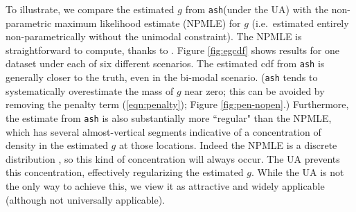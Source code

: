 \documentclass[11pt]{article}
\def\bhat{\hat{\beta}}
\def\mixfdr{{\tt mixfdr}\xspace}
\def\ash{{\tt ash}\xspace}
\begin{document}
To illustrate, we compare the
estimated $g$ from \ash (under the UA) with the non-parametric maximum likelihood estimate (NPMLE) for 
$g$ (i.e.~estimated entirely non-parametrically without the unimodal constraint). 
The NPMLE is straightforward to compute, thanks to 
\cite{koenker2014convex}. Figure \ref{fig:egcdf} shows results for one dataset under each of six different scenarios.
The estimated cdf from \ash is generally closer to the truth, even in the bi-modal scenario.
(\ash tends to systematically overestimate the mass of $g$ near zero; this can be avoided 
by removing the penalty term (\ref{eqn:penalty}); Figure \ref{fig:pen-nopen}.)
Furthermore, the estimate from \ash is also substantially more ``regular" than the  NPMLE, 
which has several almost-vertical segments indicative of a concentration of density in the estimated $g$ at those locations. 
Indeed the NPMLE is a discrete distribution \cite{koenker2014convex}, so this kind of concentration will always occur. 
The UA prevents this concentration, effectively regularizing the estimated $g$. 
While the UA is not the only way to achieve this, we view it as attractive and widely applicable (although not universally applicable).

%
\end{document}
